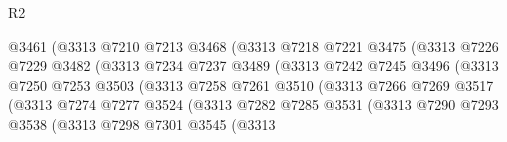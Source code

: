 \begin{lexlean}{R2}
\begin{coremodule}
                                  @3461
                                  (@3313
                                    @7210
                                    @7213
                                    @3468
                                    (@3313
                                      @7218
                                      @7221
                                      @3475
                                      (@3313
                                        @7226
                                        @7229
                                        @3482
                                        (@3313
                                          @7234
                                          @7237
                                          @3489
                                          (@3313
                                            @7242
                                            @7245
                                            @3496
                                            (@3313
                                              @7250
                                              @7253
                                              @3503
                                              (@3313
                                                @7258
                                                @7261
                                                @3510
                                                (@3313
                                                  @7266
                                                  @7269
                                                  @3517
                                                  (@3313
                                                    @7274
                                                    @7277
                                                    @3524
                                                    (@3313
                                                      @7282
                                                      @7285
                                                      @3531
                                                      (@3313
                                                        @7290
                                                        @7293
                                                        @3538
                                                        (@3313
                                                          @7298
                                                          @7301
                                                          @3545
                                                          (@3313

\end{coremodule}
\end{lexlean}
